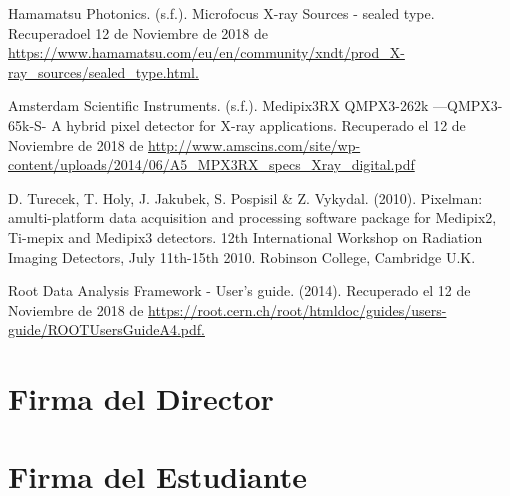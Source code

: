 \documentclass[12pt]{article}
\begin{document}
\begin{thebibliography}{10}
 Hamamatsu Photonics. (s.f.). Microfocus X-ray Sources - sealed type. Recuperadoel 12 de Noviembre de 2018 de \url{https://www.hamamatsu.com/eu/en/community/xndt/prod_X-ray_sources/sealed_type.html.}

Amsterdam Scientific Instruments. (s.f.). Medipix3RX QMPX3-262k —QMPX3-65k-S- A hybrid pixel detector for X-ray applications. Recuperado el 12 de Noviembre de 2018 de \url{http://www.amscins.com/site/wp-content/uploads/2014/06/A5_MPX3RX_specs_Xray_digital.pdf}

 D. Turecek, T. Holy, J. Jakubek, S. Pospisil & Z. Vykydal. (2010). Pixelman: amulti-platform data acquisition and processing software package for Medipix2, Ti-mepix and Medipix3 detectors. 12th International Workshop on Radiation Imaging Detectors, July 11th-15th 2010. Robinson College, Cambridge U.K.

 Root Data Analysis Framework - User’s guide. (2014). Recuperado el 12 de Noviembre de 2018 de \url{https://root.cern.ch/root/htmldoc/guides/users-guide/ROOTUsersGuideA4.pdf.}





\end{thebibliography}

\section*{Firma del Director}
\vspace{1.5cm}
\section*{Firma del Estudiante}
\vspace{1.5cm}
\end{document}
